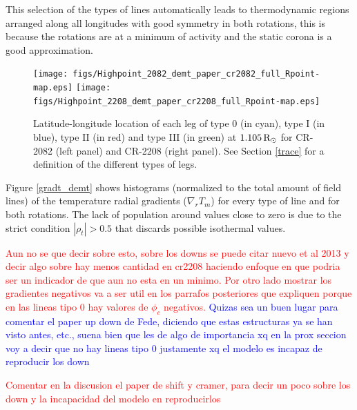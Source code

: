 \documentclass[namedreferences]{solarphysics}
\newcommand{\mrsun}{{\rm R_\odot}}
\begin{document}
\begin{article}
This selection of the types of lines automatically leads to thermodynamic regions arranged along all longitudes with good symmetry in both rotations, this is because the rotations are at a minimum of activity and the static corona is a good approximation.


\begin{figure}[h!]
\begin{center}
\texttt{[image: figs/Highpoint\_2082\_demt\_paper\_cr2082\_full\_Rpoint-map.eps]}
\texttt{[image: figs/Highpoint\_2208\_demt\_paper\_cr2208\_full\_Rpoint-map.eps]}
\caption{Latitude-longitude location of each leg of type 0 (in cyan), type I (in blue), type II (in red) and type III (in green) at $1.105\,\mrsun$ for CR-2082 (left panel) and CR-2208 (right panel). See Section \ref{trace} for a definition of the different types of legs.}
\label{rpoint_demt}
\end{center}
\end{figure} 

Figure \ref{gradt_demt} shows histograms (normalized to the total amount of field lines) of the temperature radial gradients ($\nabla_r T_m$) for every type of line and for both rotations.
The lack of population around values close to zero is due to the strict condition $|\rho_t| > 0.5$ that discards possible isothermal values.

\textcolor{red}{Aun no se que decir sobre esto, sobre los downs se puede citar nuevo et al 2013 y decir algo sobre hay menos cantidad en cr2208 haciendo enfoque en que podria ser un indicador de que aun no esta en un minimo. Por otro lado mostrar los gradientes negativos va a ser util en los parrafos posteriores que expliquen porque en las lineas tipo 0 hay valores de $\phi_c$ negativos.} 
\textcolor{blue}{Quizas sea un buen lugar para comentar el paper up down de Fede, diciendo que estas estructuras ya se han visto antes, etc., suena bien que les de algo de importancia xq en la prox seccion voy a decir que no hay lineas tipo 0 justamente xq el modelo es incapaz de reproducir los down}

\textcolor{red}{ Comentar en la discusion el paper de shift y cramer, para decir un poco sobre los down y la incapacidad del modelo en reproducirlos}



\end{article}
\end{document}
